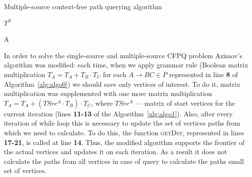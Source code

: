 \begin{algorithm}
\begin{algorithmic}[1]
\caption{Multiple-source context-free path querying algorithm}
\label{alg:algo1}
    
    
     
    \EndFor

     
        \EndFor
    \EndFor

     
        \EndFor
    \EndWhile
    \State \Return $T^S$
\EndFunction



    \EndFor
    \State \Return A
\EndFunction
\end{algorithmic}
\end{algorithm}

In order to solve the single-source and multiple-source CFPQ problem Azimov's algorithm was modified: each time, when we apply grammar rule (Boolean matrix multiplication $T_A = T_A + T_B \cdot T_C$ for each $A \rightarrow BC \in P$ represented in line \textbf{8} of Algorithm~\ref{alg:algo0}) we should save only vertices of interest. 
To do it, matrix multiplication was supplemented with one more matrix multiplication $T_A = T_A + (TSrc^A \cdot T_B) \cdot T_C$, where $TSrc^A$ --- matrix of start vertices for the current iteration (lines \textbf{11-13} of the Algorithm~\ref{alg:algo1}).
Also, after every iteration of while loop this is necessary to update the set of vertices paths from which we need to calculate. 
To do this, the function \textsc{getDst}, represented in lines \textbf{17-21}, is called at line \textbf{14}.
Thus, the modified algorithm supports the frontier of the actual vertices and updates it on each iteration.
As a result it does not calculate the paths from all vertices in case of query to calculate the paths small set of vertices.


